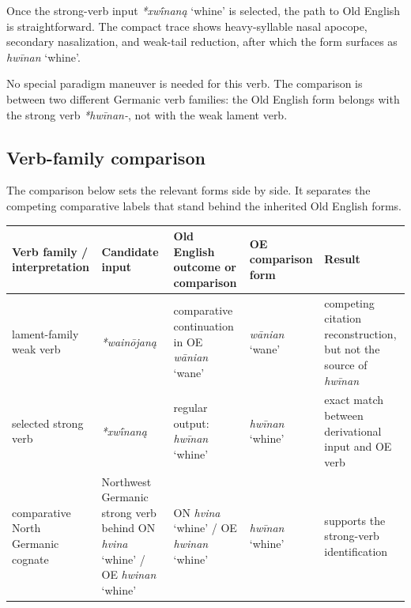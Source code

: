 \documentclass[
  british,
  a4paper,
  openany]{book}
\newcounter{none} %
\providecommand{\Recon}[1]{\emph{*#1}}
{\catcode`→=\active \global\def→{\ensuremath{\rightarrow}}}
\providecommand{\Recon}[1]{\emph{*#1}}
{\catcode`→=\active \global\def→{\ensuremath{\rightarrow}}}
\begin{document}
Once the strong-verb input {\Recon{xwī́naną} `whine'} is selected, the
path to Old English is straightforward. The compact trace shows
heavy-syllable nasal apocope, secondary nasalization, and weak-tail
reduction, after which the form surfaces as {\emph{hwīnan}} `whine'.

No special paradigm maneuver is needed for this verb. The comparison is
between two different Germanic verb families: the Old English form
belongs with the strong verb \emph{*hwīnan-}, not with the weak lament
verb.

\subsection{Verb-family comparison}\label{verb-family-comparison}

The comparison below sets the relevant forms side by side. It separates
the competing comparative labels that stand behind the inherited Old
English forms.

{\def\LTcaptype{none} %
\begin{longtable}[]{@{}
  >{\raggedright\arraybackslash}p{}
  >{\raggedright\arraybackslash}p{}
  >{\raggedright\arraybackslash}p{}
  >{\raggedright\arraybackslash}p{}
  >{\raggedright\arraybackslash}p{}@{}}
\toprule\noalign{}
\begin{minipage}[b]{\linewidth}\raggedright
Verb family / interpretation
\end{minipage} & \begin{minipage}[b]{\linewidth}\raggedright
Candidate input
\end{minipage} & \begin{minipage}[b]{\linewidth}\raggedright
Old English outcome or comparison
\end{minipage} & \begin{minipage}[b]{\linewidth}\raggedright
OE comparison form
\end{minipage} & \begin{minipage}[b]{\linewidth}\raggedright
Result
\end{minipage} \\
\midrule\noalign{}
\endhead
\bottomrule\noalign{}
\endlastfoot
lament-family weak verb & {\emph{*wainōjaną}} & comparative continuation
in OE {\emph{wānian}} `wane' & {\emph{wānian}} `wane' & competing
citation reconstruction, but not the source of \emph{hwīnan} \\
selected strong verb & {\emph{*xwī́naną}} & regular output:
{\emph{hwīnan}} `whine' & {\emph{hwīnan}} `whine' & exact match between
derivational input and OE verb \\
comparative North Germanic cognate & Northwest Germanic strong verb
behind ON {\emph{hvina}} `whine' / OE {\emph{hwinan}} `whine' & ON
{\emph{hvina}} `whine' / OE {\emph{hwinan}} `whine' & {\emph{hwīnan}}
`whine' & supports the strong-verb identification \\
\end{longtable}
}
\end{document}
